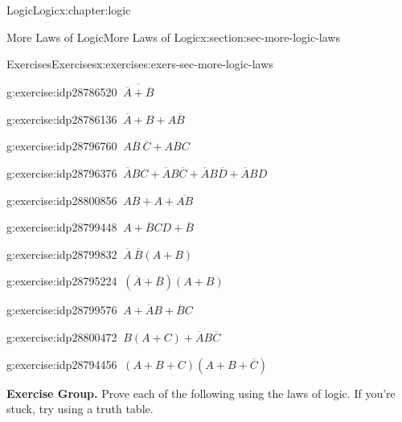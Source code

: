 \documentclass[twoside,10pt,]{book}
\numberwithin{equation}{section}
\begin{document}
\begin{chapterptx}{Logic}{}{Logic}{}{}{x:chapter:logic}
\begin{sectionptx}{More Laws of Logic}{}{More Laws of Logic}{}{}{x:section:sec-more-logic-laws}
\begin{exercises-subsection}{Exercises}{}{Exercises}{}{}{x:exercises:exers-sec-more-logic-laws}
\begin{exercisegroup}
\begin{divisionexerciseeg}{30}{}{}{g:exercise:idp28786520}%
\(\ \overline{\overline{A}{} + \overline{B}{}}\)\end{divisionexerciseeg}%
\begin{divisionexerciseeg}{31}{}{}{g:exercise:idp28786136}%
\(\ \overline{A}{}  + B + A\overline{B}{}\)\end{divisionexerciseeg}%
\begin{divisionexerciseeg}{32}{}{}{g:exercise:idp28796760}%
\(\ A\overline{B}{}~\overline{C}{}  + A\overline{B}{}C\)\end{divisionexerciseeg}%
\begin{divisionexerciseeg}{33}{}{}{g:exercise:idp28796376}%
\(\ \overline{A}{} BC + \overline{A}{}B\overline{C}{}  + \overline{A}{} B\overline{D}{} + \overline{A}{}BD\)\end{divisionexerciseeg}%
\begin{divisionexerciseeg}{34}{}{}{g:exercise:idp28800856}%
\(\ AB + A + \overline{AB}\)\end{divisionexerciseeg}%
\begin{divisionexerciseeg}{35}{}{}{g:exercise:idp28799448}%
\(\ A + \overline{B}{}CD + \overline{B}{}\)\end{divisionexerciseeg}%
\begin{divisionexerciseeg}{36}{}{}{g:exercise:idp28799832}%
\(\ \overline{A}{}~ \overline{B}{} (A + B)\)\end{divisionexerciseeg}%
\begin{divisionexerciseeg}{37}{}{}{g:exercise:idp28795224}%
\(\ (\overline{A}{} + \overline{B}{})(A + B)\)\end{divisionexerciseeg}%
\begin{divisionexerciseeg}{38}{}{}{g:exercise:idp28799576}%
\(\ A + \overline{A}{} B + \overline{B}{}C \)\end{divisionexerciseeg}%
\begin{divisionexerciseeg}{39}{}{}{g:exercise:idp28800472}%
\(\ B(A + C) + \overline{A}{} B\overline{C}{}\)\end{divisionexerciseeg}%
\begin{divisionexerciseeg}{40}{}{}{g:exercise:idp28794456}%
\(\ (A + B + C)(A + B + \overline{C}{})\)\end{divisionexerciseeg}%
\end{exercisegroup}
\par\medskip\noindent
\par\medskip\noindent%
\textbf{Exercise Group.}\space\space%
Prove each of the following using the laws of logic.  If you're stuck, try using a truth table.\begin{exercisegroup}

\end{exercisegroup}
\end{exercises-subsection}
\end{sectionptx}
\end{chapterptx}
\end{document}
